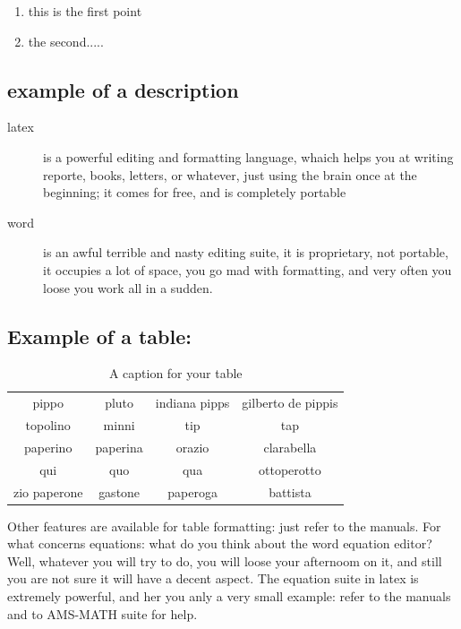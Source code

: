 \begin{enumerate}
\item this is the first point
\item the second.....
\end{enumerate}



\subsection{example of a description}
\begin{description}
\item[latex] is a powerful editing and formatting language, whaich helps you
at writing reporte, books, letters, or whatever, just using the brain 
once at the beginning; it comes for free, and is completely portable
\item[word] is an awful terrible and nasty editing suite, it is proprietary,
not portable, it occupies a lot of space, you go mad with formatting,
and very often you loose you work all in a sudden. 
\end{description}


\subsection{Example of a table:}

\begin{table}
\begin{center}
\begin{tabular}{|c|ccc|}
pippo & pluto & indiana pipps & gilberto de pippis \\
topolino & minni & tip & tap \\
paperino & paperina & orazio & clarabella \\
qui & quo & qua & ottoperotto \\
zio paperone & gastone & paperoga & battista \\  
\end{tabular}
\end{center}
\caption{A caption for your table}
\label{A-lable-for-your-table}
\end{table}


Other features are available for table formatting: just refer to the manuals.
For what concerns equations: what do you think about the word equation editor?
Well, whatever you will try to do, you will loose your afternoom on it, and
still you are not sure it will have a decent aspect. The equation suite
in latex is extremely powerful, and her you anly a very small example:
refer to the manuals and to AMS-MATH suite for help.



